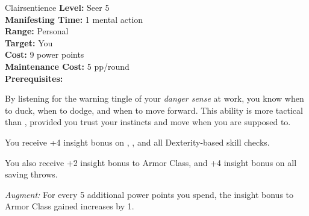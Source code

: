 {Clairsentience}
{
	\textbf{Level:}
	Seer 5\\
	\textbf{Manifesting Time:}
	1 mental action\\
	\textbf{Range:}
	Personal\\
	\textbf{Target:}
	You\\
	\textbf{Cost:}
	9 power points\\
	\textbf{Maintenance Cost:}
	5 pp/round\\
	\textbf{Prerequisites:}
	\\
}
{
	By listening for the warning tingle of your \emph{danger sense} at work, you know when to duck, when to dodge, and when to move forward. This ability is more tactical than , provided you trust your instincts and move when you are supposed to.

	You receive +4 insight bonus on , , and all Dexterity-based skill checks.

	You also receive +2 insight bonus to Armor Class, and +4 insight bonus on all saving throws.

	\textit{Augment:} For every 5 additional power points you spend, the insight bonus to Armor Class gained increases by 1.
}